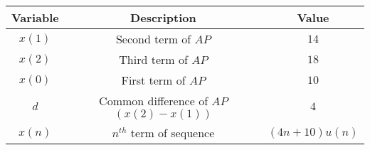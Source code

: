 \begin{tabular}{|c|c|c|} 
      \hline
\textbf{Variable}& \textbf{Description}& \textbf{Value}\\\hline
        $x(1)$& Second term of $AP$ & $14$ \\ \hline
        $x(2)$ &Third term of $AP$ & $18$ \\ \hline
         $x(0)$ & First term of $AP$ & $10$ \\ \hline
         $d$ & Common difference of $AP$ $(x(2)-x(1))$ & $4$ \\ \hline
          $x(n)$& $n^{th}$ term of sequence& $(4n+10)u(n)$\\ \hline 
          
    \end{tabular}
